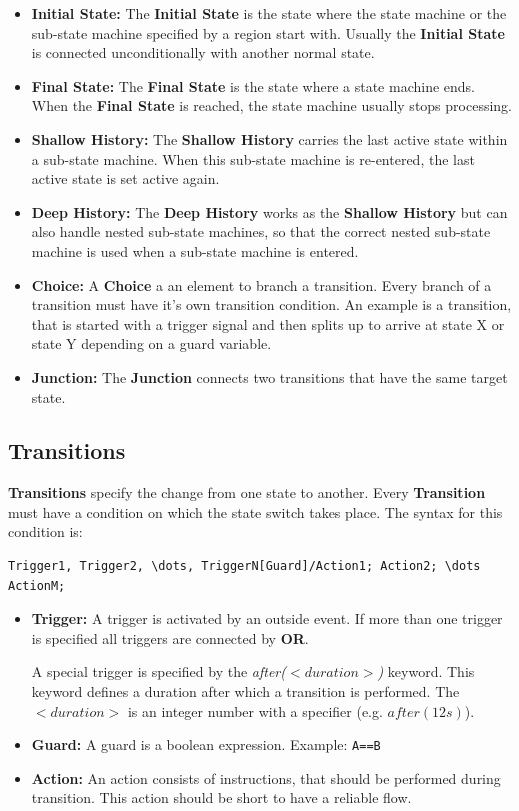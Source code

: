 \begin{itemize}
\item \textbf{Initial State:} The \textbf{Initial State} is the state where the
state machine or the sub-state machine specified by a region start with. Usually
the \textbf{Initial State} is connected unconditionally with another normal
state. 
\item \textbf{Final State:} The \textbf{Final State} is the state where a
state machine ends. When the \textbf{Final State} is reached, the state machine
usually stops processing. 
\item \textbf{Shallow History:} The \textbf{Shallow
History} carries the last active state within a sub-state machine. When this
sub-state machine is re-entered, the last active state is set active again. 
\item \textbf{Deep History:} The \textbf{Deep History} works as the \textbf{Shallow
History} but can also handle nested sub-state machines, so that the correct
nested sub-state machine is used when a sub-state machine is entered. 
\item \textbf{Choice:} A \textbf{Choice} a an element to branch a transition. Every
branch of a transition must have it's own transition condition. An example is a
transition, that is started with a trigger signal and then splits up to arrive at
state X or state Y depending on a guard variable. 
\item \textbf{Junction:} The
\textbf{Junction} connects two transitions that have the same target state.
\end{itemize}

\subsection{Transitions}
\label{sec:Transitions}

\textbf{Transitions} specify the change from one state to another. Every
\textbf{Transition} must have a condition on which the state switch takes place.
The syntax for this condition is:

\begin{verbatim}
Trigger1, Trigger2, \dots, TriggerN[Guard]/Action1; Action2; \dots ActionM; 
\end{verbatim}

\begin{itemize}
\item \textbf{Trigger:} A trigger is activated by an outside event. If more than
one trigger is specified all triggers are connected by \textbf{OR}.

A special trigger is specified by the \textit{after($<duration>$)} keyword. This
keyword defines a duration after which a transition is performed. The
$<duration>$ is an integer number with a specifier (e.g. $after(12s)$).

\item \textbf{Guard:}  A guard is a boolean expression. Example: \texttt{A==B}
\item \textbf{Action:} An action consists of instructions, that should be
performed during transition. This action should be short to have a reliable flow.
\end{itemize}

